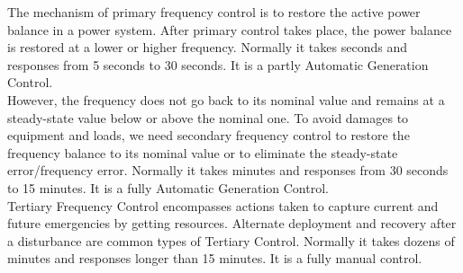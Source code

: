 The mechanism of primary frequency control is to restore the active power balance in a power system. After primary control takes place, the power balance is restored at a lower or higher frequency. Normally it takes seconds and responses from 5 seconds to 30 seconds. It is a partly Automatic Generation Control.\\


However, the frequency does not go back to its nominal value and remains at a steady-state value below or above the nominal one. To avoid damages to equipment and loads, we need secondary frequency control to \cite{machowski2011power} restore the frequency balance to its nominal value or to eliminate the steady-state error/frequency error. Normally it takes minutes and responses from 30 seconds to 15 minutes. It is a fully Automatic Generation Control.\\


Tertiary Frequency Control encompasses actions taken to capture current and future emergencies by getting resources. Alternate deployment and recovery after a disturbance are common types of Tertiary Control. Normally it takes dozens of minutes and responses longer than 15 minutes. It is a fully manual control.